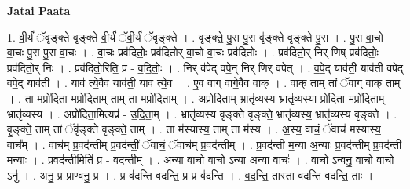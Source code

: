 \documentclass[17pt]{extarticle}
\begin{document}
\textbf{Jatai Paata} \newline

1. वी॒र्यं॑ ॅवृङ्क्ते वृङ्क्ते वी॒र्यं॑ ॅवी॒र्यं॑ ॅवृङ्क्ते । . वृ॒ङ्क्ते॒ पु॒रा पु॒रा वृ॑ङ्क्ते वृङ्क्ते पु॒रा । . पु॒रा वा॒चो वा॒चः पु॒रा पु॒रा वा॒चः । . वा॒चः प्रव॑दितोः॒ प्रव॑दितोर् वा॒चो वा॒चः प्रव॑दितोः । . प्रव॑दितो॒र् निर् णिष् प्रव॑दितोः॒ प्रव॑दितो॒र् निः । . प्रव॑दितो॒रिति॒ प्र - व॒दि॒तोः॒ । . निर् व॑पेद् वपे॒न् निर् णिर् व॑पेत् । . व॒पे॒द् याव॑ती॒ याव॑ती वपेद् वपे॒द् याव॑ती । . याव॑ त्ये॒वैव याव॑ती॒ याव॑ त्ये॒व । . ए॒व वाग् वागे॒वैव वाक् । . वाक् ताम् तां ॅवाग् वाक् ताम् । . ता मप्रो॑दिता॒ मप्रो॑दिता॒म् ताम् ता मप्रो॑दिताम् । . अप्रो॑दिता॒म् भ्रातृ॑व्यस्य॒ भ्रातृ॑व्य॒स्या प्रो॑दिता॒ मप्रो॑दिता॒म् भ्रातृ॑व्यस्य । . अप्रो॑दिता॒मित्यप्र॑ - उ॒दि॒ता॒म् । . भ्रातृ॑व्यस्य वृङ्क्ते वृङ्क्ते॒ भ्रातृ॑व्यस्य॒ भ्रातृ॑व्यस्य वृङ्क्ते । . वृ॒ङ्क्ते॒ ताम् तां ॅवृ॑ङ्क्ते वृङ्क्ते॒ ताम् । . ता म॑स्यास्य॒ ताम् ता म॑स्य । . अ॒स्य॒ वाचं॒ ॅवाच॑ मस्यास्य॒ वाच᳚म् । . वाच॑म् प्र॒वद॑न्तीम् प्र॒वद॑न्तीं॒ ॅवाचं॒ ॅवाच॑म् प्र॒वद॑न्तीम् । . प्र॒वद॑न्ती म॒न्या अ॒न्याः प्र॒वद॑न्तीम् प्र॒वद॑न्ती म॒न्याः । . प्र॒वद॑न्ती॒मिति॑ प्र - वद॑न्तीम् । . अ॒न्या वाचो॒ वाचो॒ ऽन्या अ॒न्या वाचः॑ । . वाचो ऽन्वनु॒ वाचो॒ वाचो ऽनु॑ । . अनु॒ प्र प्राण्वनु॒ प्र । . प्र व॑दन्ति वदन्ति॒ प्र प्र व॑दन्ति । . व॒द॒न्ति॒ तास्ता व॑दन्ति वदन्ति॒ ताः । \newline
\end{document}
